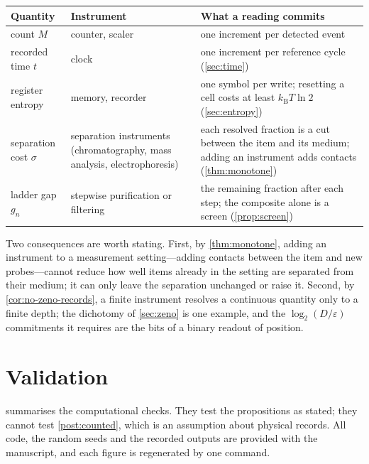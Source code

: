 \documentclass[10pt,twocolumn,a4paper]{article}
\newcommand{\kB}{k_{\mathrm{B}}}
\newcommand{\sep}{\sigma}
\begin{document}
\begin{table}[t]
\centering
\small
\begin{tabular}{@{}p{3.2cm}p{4.0cm}p{6.4cm}@{}}
\toprule
Quantity & Instrument & What a reading commits\\
\midrule
count $M$ & counter, scaler & one increment per detected event\\
recorded time $t$ & clock & one increment per reference cycle (\cref{sec:time})\\
register entropy & memory, recorder & one symbol per write; resetting a cell
costs at least $\kB T\ln2$ (\cref{sec:entropy})\\
separation cost $\sep$ & separation instruments (chromatography,
mass analysis, electrophoresis) & each resolved fraction is a cut between the
item and its medium; adding an instrument adds contacts
(\cref{thm:monotone})\\
ladder gap $g_n$ & stepwise purification or filtering & the remaining
fraction after each step; the composite alone is a screen
(\cref{prop:screen})\\
\bottomrule
\end{tabular}
\end{table}

Two consequences are worth stating. First, by \cref{thm:monotone}, adding an
instrument to a measurement setting---adding contacts between the item and
new probes---cannot reduce how well items already in the setting are
separated from their medium; it can only leave the separation unchanged or
raise it. Second, by \cref{cor:no-zeno-records}, a finite instrument resolves
a continuous quantity only to a finite depth; the dichotomy of \cref{sec:zeno}
is one example, and the $\log_2(D/\varepsilon)$ commitments it requires are
the bits of a binary readout of position.

\section{Validation}
\label{sec:validation}

 summarises the computational checks. They test the
propositions as stated; they cannot test \cref{post:counted}, which is an
assumption about physical records. All code, the random seeds and the
recorded outputs are provided with the manuscript, and each figure is
regenerated by one command.
\end{document}
